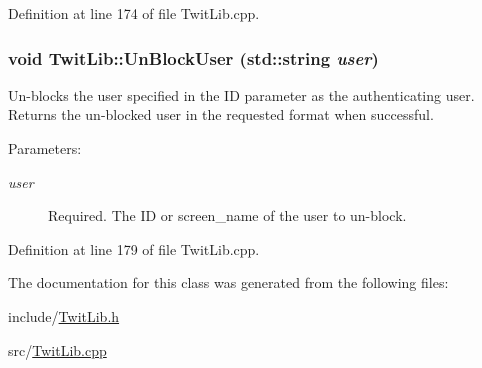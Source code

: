 Definition at line 174 of file TwitLib.cpp.\hypertarget{classTwitLib_0cc001b0c745187cb871508fe3a2bb37}{
\subsubsection{\setlength{\rightskip}{0pt plus 5cm}void TwitLib::UnBlockUser (std::string {\em user})}}
\label{classTwitLib_0cc001b0c745187cb871508fe3a2bb37}


Un-blocks the user specified in the ID parameter as the authenticating user. Returns the un-blocked user in the requested format when successful. \begin{Desc}
\item[Parameters:]
\begin{description}
\item[{\em user}]Required. The ID or screen\_\-name of the user to un-block. \end{description}
\end{Desc}


Definition at line 179 of file TwitLib.cpp.

The documentation for this class was generated from the following files:\begin{CompactItemize}
\item 
include/\hyperlink{TwitLib_8h}{TwitLib.h}\item 
src/\hyperlink{TwitLib_8cpp}{TwitLib.cpp}\end{CompactItemize}
